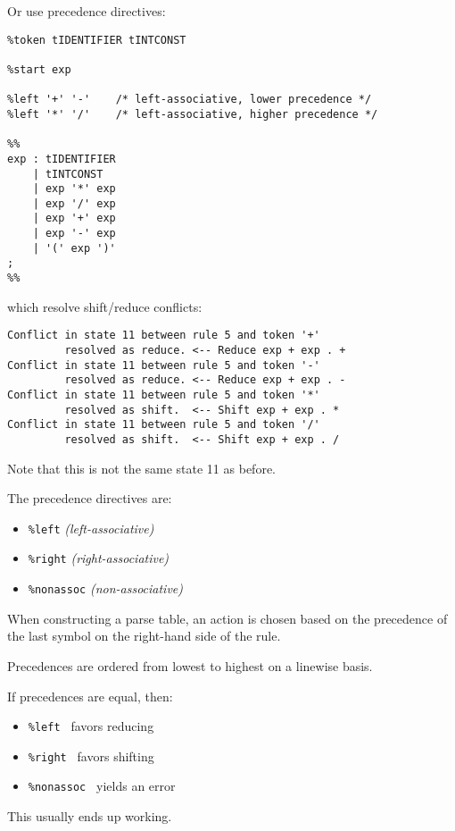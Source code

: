 \begin{slide*}
Or use precedence directives:

\begin{scriptsize}
\begin{verbatim}
%token tIDENTIFIER tINTCONST

%start exp

%left '+' '-'    /* left-associative, lower precedence */
%left '*' '/'    /* left-associative, higher precedence */

%% 
exp : tIDENTIFIER
    | tINTCONST
    | exp '*' exp
    | exp '/' exp
    | exp '+' exp
    | exp '-' exp
    | '(' exp ')'
;
%%
\end{verbatim}
\end{scriptsize}

which resolve shift/reduce conflicts:

\begin{scriptsize}
\begin{verbatim}
Conflict in state 11 between rule 5 and token '+' 
         resolved as reduce. <-- Reduce exp + exp . +
Conflict in state 11 between rule 5 and token '-' 
         resolved as reduce. <-- Reduce exp + exp . -
Conflict in state 11 between rule 5 and token '*' 
         resolved as shift.  <-- Shift exp + exp . *
Conflict in state 11 between rule 5 and token '/' 
         resolved as shift.  <-- Shift exp + exp . /
\end{verbatim}
\end{scriptsize}
Note that this is not the same state 11 as before.
\vfil
\end{slide*}

\begin{slide*}
The precedence directives are:
\begin{itemize}
\item {\tt \%left} {\em (left-associative)}
\item {\tt \%right} {\em (right-associative)}
\item {\tt \%nonassoc} {\em (non-associative)}
\end{itemize}
When constructing a parse table, an action is chosen based on the
precedence of the last symbol on the right-hand side of the rule.

\vspace{0.1in}

Precedences are ordered from lowest to highest on a linewise basis.

\vspace{0.1in}

If precedences are equal, then:
\begin{itemize}
\item {\tt \%left~} favors reducing
\item {\tt \%right~} favors shifting
\item {\tt \%nonassoc~} yields an error
\end{itemize}
This usually ends up working.
\vfil
\end{slide*}

